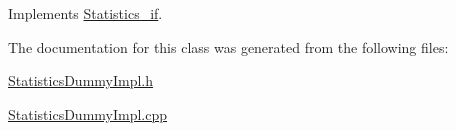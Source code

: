 Implements \hyperlink{class_statistics__if_ae0ad6bf18f8263003b0ac7552318be57}{Statistics\+\_\+if}.



The documentation for this class was generated from the following files\+:\begin{DoxyCompactItemize}
\item 
\hyperlink{_statistics_dummy_impl_8h}{Statistics\+Dummy\+Impl.\+h}\item 
\hyperlink{_statistics_dummy_impl_8cpp}{Statistics\+Dummy\+Impl.\+cpp}\end{DoxyCompactItemize}
